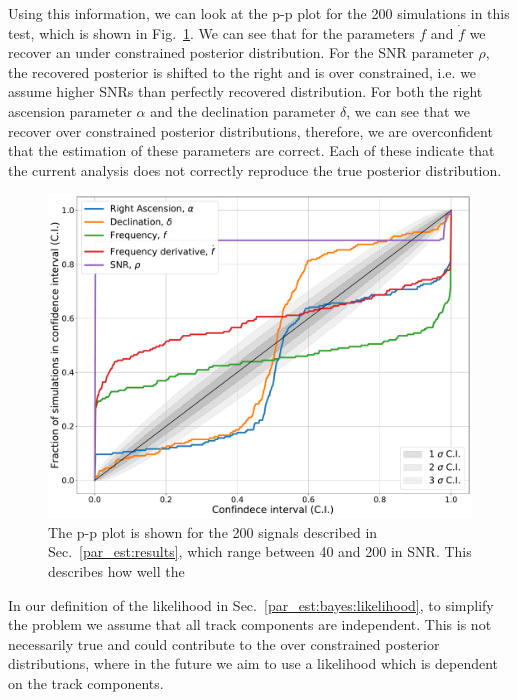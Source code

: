 Using this information, we can look at the p-p plot for the 200 simulations in this test, which is shown in Fig.~\ref{par_est:results:ppplot}.
We can see that for the parameters $f$ and $\dot{f}$ we recover an under constrained posterior distribution.
For the \gls{SNR} parameter $\rho$, the recovered posterior is shifted to the right and is over constrained, i.e. we assume higher \glspl{SNR} than perfectly recovered distribution.
For both the right ascension parameter $\alpha$ and the declination parameter $\delta$, we can see that we recover over constrained posterior distributions, therefore, we are overconfident that the estimation of these parameters are correct.
Each of these indicate that the current analysis does not correctly reproduce the true posterior distribution.
%
\begin{figure}[ht]
    \centering
    \includegraphics[width=\linewidth]{C5_parameter/ppplot.pdf}
    \caption[p-p plot for the CW simulations]{The p-p plot is shown for the 200 signals described in Sec.~\ref{par_est:results}, which range between 40 and 200 in \gls{SNR}. This describes how well the }
    \label{par_est:results:ppplot}
\end{figure}

In our definition of the likelihood in Sec.~\ref{par_est:bayes:likelihood}, to simplify the problem we assume that all track components are independent. 
This is not necessarily true and could contribute to the over constrained posterior distributions, where in the future we aim to use a likelihood which is dependent on the track components.


